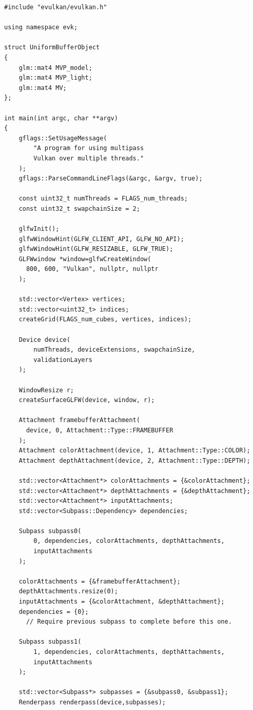 \documentclass[12pt]{report}
\theoremstyle{definition}
\begin{document}
    \begin{lstlisting}[caption=Multipass drawing with evulkan library., showstringspaces=false]
#include "evulkan/evulkan.h"

using namespace evk;

struct UniformBufferObject
{
    glm::mat4 MVP_model;
    glm::mat4 MVP_light;
    glm::mat4 MV;
};

int main(int argc, char **argv)
{
    gflags::SetUsageMessage(
        "A program for using multipass 
        Vulkan over multiple threads."
    );
    gflags::ParseCommandLineFlags(&argc, &argv, true);

    const uint32_t numThreads = FLAGS_num_threads;
    const uint32_t swapchainSize = 2;

    glfwInit();
    glfwWindowHint(GLFW_CLIENT_API, GLFW_NO_API);
    glfwWindowHint(GLFW_RESIZABLE, GLFW_TRUE);
    GLFWwindow *window=glfwCreateWindow(
      800, 600, "Vulkan", nullptr, nullptr
    );

    std::vector<Vertex> vertices;
    std::vector<uint32_t> indices;
    createGrid(FLAGS_num_cubes, vertices, indices);

    Device device(
        numThreads, deviceExtensions, swapchainSize,
        validationLayers
    );

    WindowResize r;
    createSurfaceGLFW(device, window, r);

    Attachment framebufferAttachment(
      device, 0, Attachment::Type::FRAMEBUFFER
    );
    Attachment colorAttachment(device, 1, Attachment::Type::COLOR);
    Attachment depthAttachment(device, 2, Attachment::Type::DEPTH);

    std::vector<Attachment*> colorAttachments = {&colorAttachment};
    std::vector<Attachment*> depthAttachments = {&depthAttachment};
    std::vector<Attachment*> inputAttachments;
    std::vector<Subpass::Dependency> dependencies;

    Subpass subpass0(
        0, dependencies, colorAttachments, depthAttachments,
        inputAttachments
    );

    colorAttachments = {&framebufferAttachment};
    depthAttachments.resize(0);
    inputAttachments = {&colorAttachment, &depthAttachment};
    dependencies = {0};
      // Require previous subpass to complete before this one.

    Subpass subpass1(
        1, dependencies, colorAttachments, depthAttachments,
        inputAttachments
    );

    std::vector<Subpass*> subpasses = {&subpass0, &subpass1};
    Renderpass renderpass(device,subpasses);


\end{lstlisting}
\end{document}
